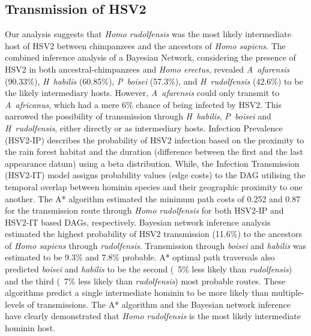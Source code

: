 \documentclass[fleqn,10pt]{wlscirep}
\begin{document}
\subsection*{Transmission of HSV2}
Our analysis suggests that \textit{Homo rudolfensis} was the most likely intermediate host of HSV2 between chimpanzees and the ancestors of \textit{Homo sapiens}. The combined inference analysis of a Bayesian Network, considering the presence of HSV2 in both ancestral-chimpanzees and \textit{Homo erectus}, revealed \textit{A~afarensis} (90.33\%), \textit{H~habilis} (60.85\%), \textit{P~boisei} (57.3\%), and \textit{H~rudolfensis} (42.6\%) to be the likely intermediary hosts. However, \textit{A~afarensis} could only transmit to \textit{A~africanus}, which had a mere 6\% chance of being infected by HSV2. This narrowed the possibility of transmission through \textit{H~habilis}, \textit{P~boisei} and \textit{H~rudolfensis}, either directly or as intermediary hosts. Infection Prevalence (HSV2-IP) describes the probability of HSV2 infection based on the proximity to the rain forest habitat and the duration (difference between the first and the last appearance datum) using a beta distribution. While, the Infection Transmission (HSV2-IT) model assigns probability values (edge costs) to the DAG utilising the temporal overlap between hominin species and their geographic proximity to one another. The A* algorithm estimated the minimum path costs of 0.252 and 0.87 for the transmission route through \textit{Homo rudolfensis} for both HSV2-IP and HSV2-IT based DAGs, respectively. Bayesian network inference analysis estimated the highest probability of HSV2 transmission (11.6\%) to the ancestors of \textit{Homo sapiens} through \textit{rudolfensis}. Transmission through \textit{boisei} and \textit{habilis} was estimated to be 9.3\% and 7.8\% probable. A* optimal path traversals also predicted \textit{boisei} and \textit{habilis} to be the second (~5\% less likely than \textit{rudolfensis}) and the third (~7\% less likely than \textit{rudolfensis}) most probable routes. These algorithms predict a single intermediate hominin to be more likely than multiple-levels of transmissions. The A* algorithm and the Bayesian network inference have clearly demonstrated that \textit{Homo rudolfensis} is the most likely intermediate hominin host.  
\end{document}
